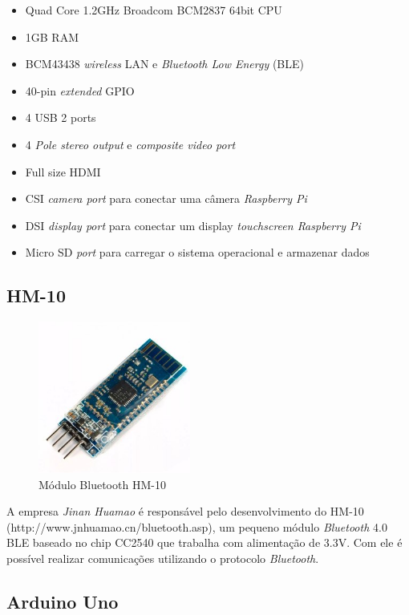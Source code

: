 \documentclass[
	12pt,				%
	oneside,			%
	a4paper,			%
	brazil				%
]{abntex2}
\begin{document}
{\begin{itemize}
\item Quad Core 1.2GHz Broadcom BCM2837 64bit CPU
\item 1GB RAM
\item BCM43438 \textit{wireless} LAN e \textit{Bluetooth Low Energy} (BLE)
\item 40-pin \textit{extended} GPIO
\item 4 USB 2 ports
\item 4 \textit{Pole stereo output} e \textit{composite video port}
\item Full size HDMI
\item CSI \textit{camera port} para conectar uma câmera \textit{Raspberry Pi}
\item DSI \textit{display port} para conectar um display \textit{touchscreen Raspberry Pi}
\item Micro SD \textit{port} para carregar o sistema operacional e armazenar dados
\end{itemize}


\subsection{HM-10}

\begin{figure}[!h]
\centering
\includegraphics[width=5cm, center]{images/hm-10}
\caption{Módulo Bluetooth HM-10}
\label{Rotulo}
\end{figure}

A empresa \textit{Jinan Huamao} é responsável pelo desenvolvimento do HM-10 (http://www.jnhuamao.cn/bluetooth.asp), um pequeno módulo \textit{Bluetooth} 4.0 BLE baseado no chip CC2540 que trabalha com alimentação de 3.3V. Com ele é possível realizar comunicações utilizando o protocolo \textit{Bluetooth}.

\newpage

\subsection{Arduino Uno}

}
\end{document}
